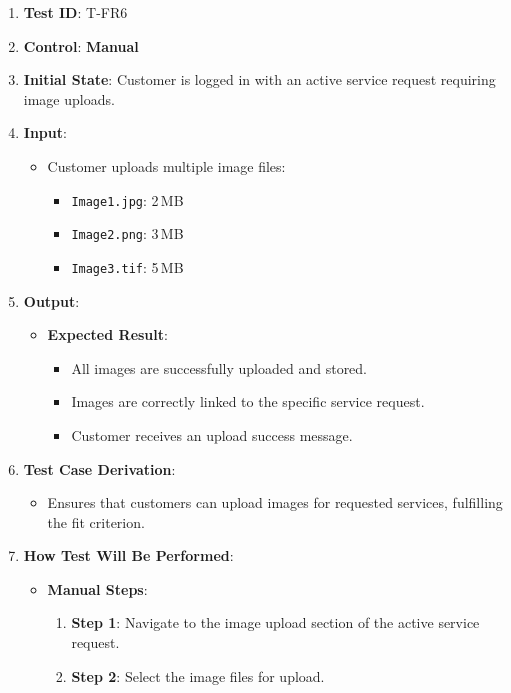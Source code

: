 \documentclass[12pt, titlepage]{article}
\begin{document}
\begin{enumerate}
    \item \textbf{Test ID}: T-FR6
    \item \textbf{Control}: \textbf{Manual}
    \item \textbf{Initial State}: Customer is logged in with an active service request requiring image uploads.
    \item \textbf{Input}:
    \begin{itemize}
        \item Customer uploads multiple image files:
        \begin{itemize}
            \item \texttt{Image1.jpg}: 2\,MB
            \item \texttt{Image2.png}: 3\,MB
            \item \texttt{Image3.tif}: 5\,MB
        \end{itemize}
    \end{itemize}
    \item \textbf{Output}:
    \begin{itemize}
        \item \textbf{Expected Result}:
        \begin{itemize}
            \item All images are successfully uploaded and stored.
            \item Images are correctly linked to the specific service request.
            \item Customer receives an upload success message.
        \end{itemize}
    \end{itemize}
    \item \textbf{Test Case Derivation}:
    \begin{itemize}
        \item Ensures that customers can upload images for requested services, fulfilling the fit criterion.
    \end{itemize}
    \item \textbf{How Test Will Be Performed}:
    \begin{itemize}
        \item \textbf{Manual Steps}:
        \begin{enumerate}
            \item \textbf{Step 1}: Navigate to the image upload section of the active service request.
            \item \textbf{Step 2}: Select the image files for upload.

\end{enumerate}
\end{itemize}
\end{enumerate}
\end{document}
